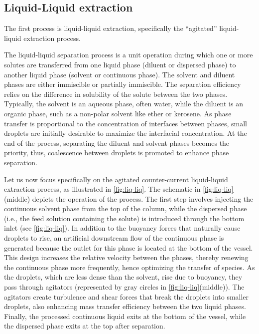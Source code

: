 \subsection{Liquid-Liquid extraction}


The first process is liquid-liquid extraction, specifically the ``agitated'' liquid-liquid extraction process. 

The liquid-liquid separation process is a unit operation during which one or more solutes are transferred from one liquid phase (diluent or dispersed phase) to another liquid phase (solvent or continuous phase).
The solvent and diluent phases are either immiscible or partially immiscible.
The separation efficiency relies on the difference in solubility of the solute between the two phases.
Typically, the solvent is an aqueous phase, often water, while the diluent is an organic phase, such as a non-polar solvent like ether or kerosene.
As phase transfer is proportional to the concentration of interfaces between phases, small droplets are initially desirable to maximize the interfacial concentration.
At the end of the process, separating the diluent and solvent phases becomes the priority, thus, coalescence between droplets is promoted to enhance phase separation.

Let us now focus specifically on the agitated counter-current liquid-liquid extraction process, as illustrated in \ref{fig:liq-liq}. 
The schematic in \ref{fig:liq-liq} (middle) depicts the operation of the process.
The first step involves injecting the continuous solvent phase from the top of the column, while the dispersed phase (i.e., the feed solution containing the solute) is introduced through the bottom inlet (see \ref{fig:liq-liq}). 
In addition to the buoyancy forces that naturally cause droplets to rise, an artificial downstream flow of the continuous phase is generated because the outlet for this phase is located at the bottom of the vessel. 
This design increases the relative velocity between the phases, thereby renewing the continuous phase more frequently, hence optimizing the transfer of species.
As the droplets, which are less dense than the solvent, rise due to buoyancy, they pass through agitators (represented by gray circles in \ref{fig:liq-liq}(middle)). 
The agitators create turbulence and shear forces that break the droplets into smaller droplets, also enhancing mass transfer efficiency between the two liquid phases. 
Finally, the processed continuous liquid exits at the bottom of the vessel, while the dispersed phase exits at the top after separation. 

